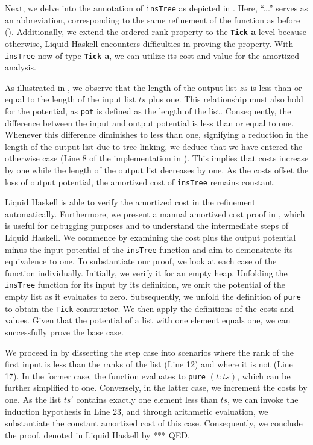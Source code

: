 \documentclass{clmthesis}
\begin{document}
Next, we delve into the annotation of \texttt{insTree} as depicted in . Here, \enquote{...} serves as an abbreviation, corresponding to the same refinement of the function as before (). Additionally, we extend the ordered rank property to the \textbf{\lstinline{Tick} a} level because otherwise, Liquid Haskell encounters difficulties in proving the property. With \texttt{insTree} now of type \textbf{\lstinline{Tick} a}, we can utilize its cost and value for the amortized analysis.

As illustrated in , we observe that the length of the output list $zs$ is less than or equal to the length of the input list $ts$ plus one. This relationship must also hold for the potential, as \texttt{pot} is defined as the length of the list. Consequently, the difference between the input and output potential is less than or equal to one. Whenever this difference diminishes to less than one, signifying a reduction in the length of the output list due to tree linking, we deduce that we have entered the otherwise case (Line 8 of the implementation in ). This implies that costs increase by one while the length of the output list decreases by one. As the costs offset the loss of output potential, the amortized cost of \texttt{insTree} remains constant.

Liquid Haskell is able to verify the amortized cost in the refinement automatically. Furthermore, we present a manual amortized cost proof in , which is useful for debugging purposes and to understand the intermediate steps of Liquid Haskell. We commence by examining the cost plus the output potential minus the input potential of the \texttt{insTree} function and aim to demonstrate its equivalence to one. To substantiate our proof, we look at each case of the function individually. Initially, we verify it for an empty heap. Unfolding the \texttt{insTree} function for its input by its definition, we omit the potential of the empty list as it evaluates to zero. Subsequently, we unfold the definition of \texttt{pure} to obtain the \lstinline{Tick} constructor. We then apply the definitions of the costs and values. Given that the potential of a list with one element equals one, we can successfully prove the base case.

We proceed in  by dissecting the step case into scenarios where the rank of the first input is less than the ranks of the list (Line 12) and where it is not (Line 17). In the former case, the function evaluates to \texttt{pure} $(t:ts)$, which can be further simplified to one. Conversely, in the latter case, we increment the costs by one. As the list $ts'$ contains exactly one element less than $ts$, we can invoke the induction hypothesis in Line 23, and through arithmetic evaluation, we substantiate the constant amortized cost of this case. Consequently, we conclude the proof, denoted in Liquid Haskell by *** QED.
\end{document}
